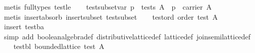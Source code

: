 \begin{isabellebody}
\ {}metis\ {}full{}types{}\ test{}le{}%
\endisatagproof
{\isafoldproof}%
%
\isadelimproof
\isanewline
%
\endisadelimproof
\isanewline
\ \ \isamarkupfalse%
\ test{}subset{}var{}\ {}p\ {}\ tests\ A\ {}\ p\ {}\ carrier\ A{}\isanewline
%
\isadelimproof
\ \ \ \ %
\endisadelimproof
%
\isatagproof
{}\isamarkupfalse%
\ {}metis\ insert{}absorb\ insert{}subset\ test{}subset{}%
\endisatagproof
{\isafoldproof}%
%
\isadelimproof
\isanewline
%
\endisadelimproof
\isanewline
\ \ \isamarkupfalse%
\ test{}ord{}\ {}order\ {}test\ A{}{}\isanewline
%
\isadelimproof
\ \ \ \ %
\endisadelimproof
%
\isatagproof
{}\isamarkupfalse%
\ {}insert\ test{}ba{}\isanewline
\ \ \ \ \isamarkupfalse%
\ {}simp\ add{}\ boolean{}algebra{}def\ distributive{}lattice{}def\ lattice{}def\ join{}semilattice{}def{}%
\endisatagproof
{\isafoldproof}%
%
\isadelimproof
\isanewline
%
\endisadelimproof
\isanewline
\ \ \isamarkupfalse%
\ test{}bl{}\ {}bounded{}lattice\ {}test\ A{}{}\isanewline

\end{isabellebody}
